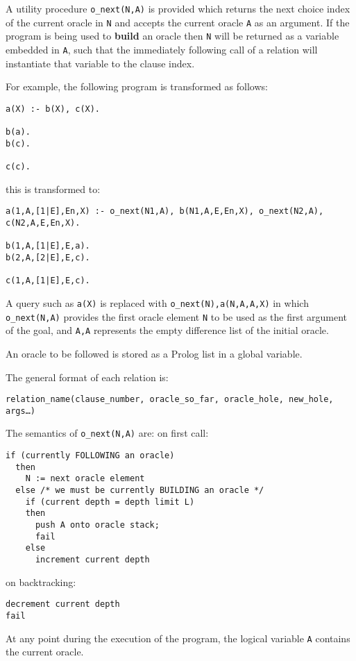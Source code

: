A utility procedure \texttt{o\_{}next(N,A)} is provided which returns the next
choice index of the current oracle in \texttt{N} and accepts the current oracle
\texttt{A} as an argument.  If the program is being used to \textbf{build} an
oracle then \texttt{N} will be returned as a variable embedded in \texttt{A}, such
that the immediately following call of a relation will instantiate that variable
to the clause index.

For example, the following program is transformed as follows:
\begin{verbatim}
a(X) :- b(X), c(X).

b(a).
b(c).

c(c).
\end{verbatim}
this is transformed to:
\begin{verbatim}
a(1,A,[1|E],En,X) :- o_next(N1,A), b(N1,A,E,En,X), o_next(N2,A), c(N2,A,E,En,X).

b(1,A,[1|E],E,a).
b(2,A,[2|E],E,c).

c(1,A,[1|E],E,c).
\end{verbatim}

A query such as \texttt{a(X)} is replaced with \texttt{o\_{}next(N),a(N,A,A,X)} in
which \texttt{o\_{}next(N,A)} provides the first oracle element \texttt{N}
to be used as the first argument of the goal, and \texttt{A,A} represents the
empty difference list of the initial oracle.

An oracle to be followed is stored as a Prolog list in a global variable.

The general format of each relation is:\\
\centerline{\texttt{relation\_{}name(clause\_{}number, oracle\_{}so\_{}far, oracle\_{}hole, new\_{}hole, args\ldots)}}

The semantics of \texttt{o\_{}next(N,A)} are:
on first call:
\begin{verbatim}
if (currently FOLLOWING an oracle)
  then
    N := next oracle element
  else /* we must be currently BUILDING an oracle */
    if (current depth = depth limit L)
    then
      push A onto oracle stack;
      fail
    else
      increment current depth
\end{verbatim}
on backtracking:
\begin{verbatim}
decrement current depth
fail
\end{verbatim}

At any point during the execution of the program, the logical variable
\texttt{A} contains the current oracle.

